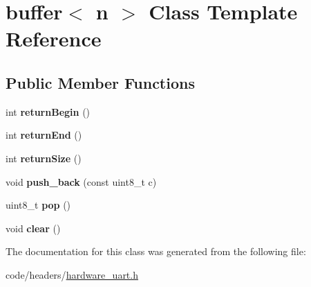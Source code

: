 \hypertarget{classbuffer}{}\section{buffer$<$ n $>$ Class Template Reference}
\label{classbuffer}
\subsection*{Public Member Functions}
\begin{DoxyCompactItemize}
\item 
\mbox{\label{classbuffer_aff92199fadb5da62646008c2fa7b3a07}} 
int {\bfseries return\+Begin} ()
\item 
\mbox{\label{classbuffer_ae6ef03f00a09332e04e21f61bd216767}} 
int {\bfseries return\+End} ()
\item 
\mbox{\label{classbuffer_ade7959181a0fe6c4dff38053a07b2ece}} 
int {\bfseries return\+Size} ()
\item 
\mbox{\label{classbuffer_a9a581b60e734970b849182ecc150590f}} 
void {\bfseries push\+\_\+back} (const uint8\+\_\+t c)
\item 
\mbox{\label{classbuffer_a43392276a25538804cf08852d4bd54f6}} 
uint8\+\_\+t {\bfseries pop} ()
\item 
\mbox{\label{classbuffer_a3de5ff2f764dd574776d3292ca522a76}} 
void {\bfseries clear} ()
\end{DoxyCompactItemize}


The documentation for this class was generated from the following file\+:\begin{DoxyCompactItemize}
\item 
code/headers/\hyperlink{hardware__uart_8h}{hardware\+\_\+uart.\+h}\end{DoxyCompactItemize}
